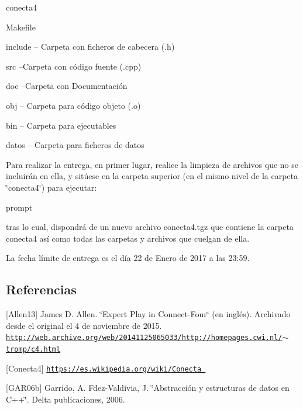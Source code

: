 conecta4
\begin{DoxyItemize}
\item Makefile
\item include -- Carpeta con ficheros de cabecera (.h)
\item src --Carpeta con código fuente (.cpp)
\item doc --Carpeta con Documentación
\item obj -- Carpeta para código objeto (.o)
\item bin -- Carpeta para ejecutables
\item datos -- Carpeta para ficheros de datos
\end{DoxyItemize}

Para realizar la entrega, en primer lugar, realice la limpieza de archivos que no se incluirán en ella, y sitúese en la carpeta superior (en el mismo nivel de la carpeta \char`\"{}conecta4\char`\"{}) para ejecutar\+: 
\begin{DoxyCode}
prompt%
\end{DoxyCode}
 tras lo cual, dispondrá de un nuevo archivo conecta4.\+tgz que contiene la carpeta conecta4 así como todas las carpetas y archivos que cuelgan de ella.

La fecha límite de entrega es el día 22 de Enero de 2017 a las 23\+:59.\hypertarget{index_referencias}{}\subsection{Referencias}\label{index_referencias}
\mbox{[}Allen13\mbox{]} James D. Allen. \char`\"{}\+Expert Play in Connect-\/\+Four\char`\"{} (en inglés). Archivado desde el original el 4 de noviembre de 2015. \href{http://web.archive.org/web/20141125065033/http://homepages.cwi.nl/~tromp/c4.html}{\tt http\+://web.\+archive.\+org/web/20141125065033/http\+://homepages.\+cwi.\+nl/$\sim$tromp/c4.\+html}

\mbox{[}Conecta4\mbox{]} \href{https://es.wikipedia.org/wiki/Conecta_4}{\tt https\+://es.\+wikipedia.\+org/wiki/\+Conecta\+\_}

\mbox{[}G\+A\+R06b\mbox{]} Garrido, A. Fdez-\/\+Valdivia, J. \char`\"{}\+Abstracción y estructuras de datos en C++\char`\"{}. Delta publicaciones, 2006. 